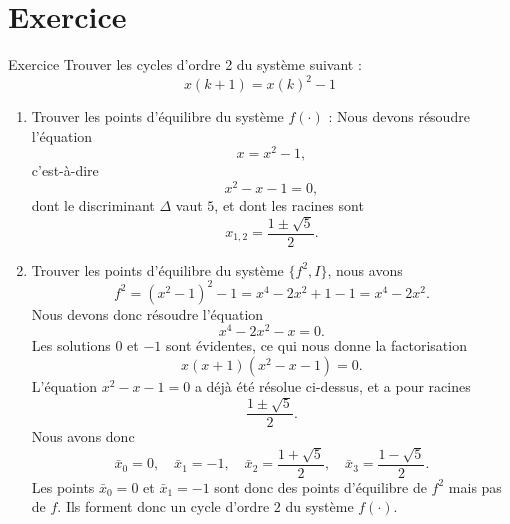     \section{Exercice} 
        \begin{exercise}{Exercice}
            Trouver les cycles d'ordre 2 du système suivant :
            \begin{equation}
                x(k + 1) = x(k)^2 - 1
            \end{equation}
        \end{exercise}
        \begin{enumerate}
            \item Trouver les points d’équilibre du système $f(\cdot)$ :  
            Nous devons résoudre l’équation 
            \begin{equation}
                x = x^2 - 1,
            \end{equation}
            c'est-à-dire
            \begin{equation}
                x^2 - x - 1 = 0,
            \end{equation}
            dont le discriminant $\Delta$ vaut $5$, et dont les racines sont 
            \begin{equation}
                x_{1,2} = \frac{1 \pm \sqrt{5}}{2}.
            \end{equation}
            \item Trouver les points d’équilibre du système $\{f^2, I\}$, nous avons
            \begin{equation}
                f^2 = (x^2 - 1)^2 - 1 = x^4 - 2x^2 + 1 - 1 = x^4 - 2x^2.
            \end{equation}
            Nous devons donc résoudre l’équation 
            \begin{equation}
                x^4 - 2x^2 - x = 0.
            \end{equation}
            Les solutions $0$ et $-1$ sont évidentes, ce qui nous donne la factorisation
            \begin{equation}
                x(x + 1)(x^2 - x - 1) = 0.
            \end{equation}
            L’équation $x^2 - x - 1 = 0$ a déjà été résolue ci-dessus, et a pour racines 
            \begin{equation}
                \frac{1 \pm \sqrt{5}}{2}.
            \end{equation}
            Nous avons donc 
            \begin{equation}
                \bar{x}_0 = 0, \quad \bar{x}_1 = -1, \quad \bar{x}_2 = \frac{1 + \sqrt{5}}{2}, \quad \bar{x}_3 = \frac{1 - \sqrt{5}}{2}.
            \end{equation}
            Les points $\bar{x}_0 = 0$ et $\bar{x}_1 = -1$ sont donc des points d’équilibre de $f^2$ mais pas de $f$. Ils forment donc un cycle d’ordre $2$ du système $f(\cdot)$.
        \end{enumerate}
